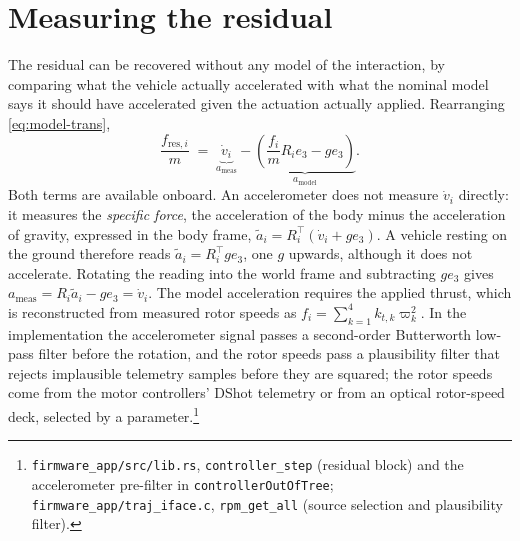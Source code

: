 \section{Measuring the residual}
\label{sec:model-measure}

The residual can be recovered without any model of the interaction, by comparing what the vehicle
actually accelerated with what the nominal model says it should have accelerated given the
actuation actually applied. Rearranging \eqref{eq:model-trans},
%
\begin{equation}
  \frac{f_{\mathrm{res},i}}{m}
  \;=\; \underbrace{\dot{v}_i}_{a_{\mathrm{meas}}}
      - \underbrace{\left( \frac{f_i}{m} R_i e_3 - g e_3 \right)}_{a_{\mathrm{model}}} .
  \label{eq:model-ares}
\end{equation}
%
Both terms are available onboard. An accelerometer does not measure $\dot v_i$ directly: it
measures the \emph{specific force}, the acceleration of the body minus the acceleration of gravity,
expressed in the body frame, $\tilde a_i = R_i^\top(\dot v_i + g e_3)$. A vehicle resting on the
ground therefore reads $\tilde a_i = R_i^\top g e_3$, one $g$ upwards, although it does not
accelerate. Rotating the reading into the world frame and subtracting $g e_3$ gives
$a_{\mathrm{meas}} = R_i\tilde a_i - g e_3 = \dot v_i$. The model acceleration requires the applied
thrust, which is reconstructed from measured rotor speeds as $f_i = \sum_{k=1}^{4} k_{t,k}\varpi_k^2$.
In the implementation the accelerometer signal passes a second-order Butterworth low-pass filter
before the rotation, and the rotor speeds pass a plausibility filter that rejects implausible
telemetry samples before they are squared; the rotor speeds come from the motor controllers' DShot
telemetry or from an optical rotor-speed deck, selected by a parameter.\footnote{%
\texttt{firmware\_app/src/lib.rs}, \texttt{controller\_step} (residual block) and the accelerometer
pre-filter in \texttt{controllerOutOfTree}; \texttt{firmware\_app/traj\_iface.c},
\texttt{rpm\_get\_all} (source selection and plausibility filter).}

